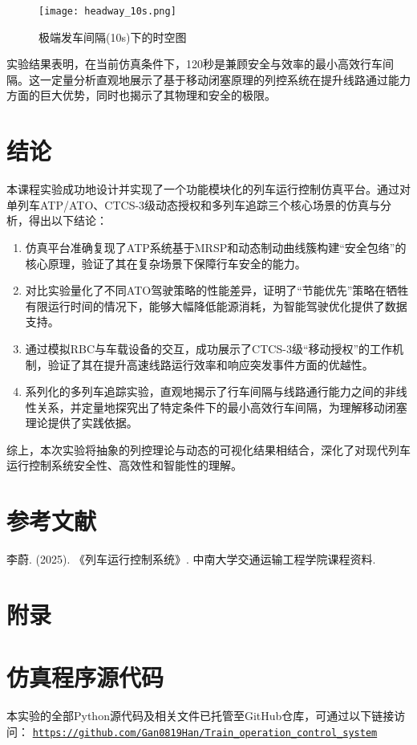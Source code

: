 \documentclass[11pt, a4paper]{ctexart}
\begin{document}
\begin{figure}[h!]
    \centering
    \texttt{[image: headway\_10s.png]}
    \caption{极端发车间隔(10s)下的时空图}
    \label{fig:headway_extreme}
\end{figure}

实验结果表明，在当前仿真条件下，120秒是兼顾安全与效率的最小高效行车间隔。这一定量分析直观地展示了基于移动闭塞原理的列控系统在提升线路通过能力方面的巨大优势，同时也揭示了其物理和安全的极限。

\section{结论}
本课程实验成功地设计并实现了一个功能模块化的列车运行控制仿真平台。通过对单列车ATP/ATO、CTCS-3级动态授权和多列车追踪三个核心场景的仿真与分析，得出以下结论：
\begin{enumerate}
    \item 仿真平台准确复现了ATP系统基于MRSP和动态制动曲线簇构建“安全包络”的核心原理，验证了其在复杂场景下保障行车安全的能力。
    \item 对比实验量化了不同ATO驾驶策略的性能差异，证明了“节能优先”策略在牺牲有限运行时间的情况下，能够大幅降低能源消耗，为智能驾驶优化提供了数据支持。
    \item 通过模拟RBC与车载设备的交互，成功展示了CTCS-3级“移动授权”的工作机制，验证了其在提升高速线路运行效率和响应突发事件方面的优越性。
    \item 系列化的多列车追踪实验，直观地揭示了行车间隔与线路通行能力之间的非线性关系，并定量地探究出了特定条件下的最小高效行车间隔，为理解移动闭塞理论提供了实践依据。
\end{enumerate}
综上，本次实验将抽象的列控理论与动态的可视化结果相结合，深化了对现代列车运行控制系统安全性、高效性和智能性的理解。

\section{参考文献}
\begin{thebibliography}{9}
     李蔚. (2025). 《列车运行控制系统》. 中南大学交通运输工程学院课程资料.
\end{thebibliography}

\section*{附录}
\appendix
\section{仿真程序源代码}
本实验的全部Python源代码及相关文件已托管至GitHub仓库，可通过以下链接访问：
\href{https://github.com/Gan0819Han/Train_operation_control_system}{\texttt{https://github.com/Gan0819Han/Train\_operation\_control\_system}}
\end{document}
